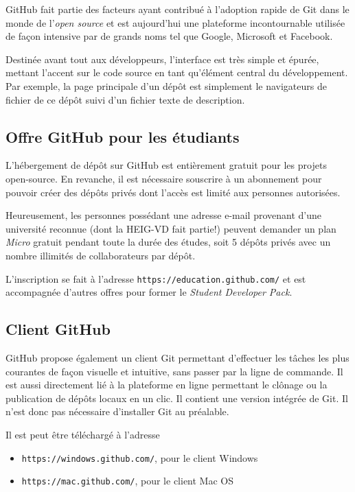 \documentclass[11pt,a4paper]{article}
\begin{document}
GitHub fait partie des facteurs ayant contribué à l'adoption rapide de Git dans le monde de l'\textit{open source} et est aujourd'hui une plateforme incontournable utilisée de façon intensive par de grands noms tel que Google, Microsoft et Facebook. 

Destinée avant tout aux développeurs, l'interface est très simple et épurée, mettant l'accent sur le code source en tant qu'élément central du développement. Par exemple, la page principale d'un dépôt est simplement le navigateurs de fichier de ce dépôt suivi d'un fichier texte de description.

\subsection{Offre GitHub pour les étudiants}

L'hébergement de dépôt sur GitHub est entièrement gratuit pour les projets open-source.
En revanche, il est nécessaire souscrire à un abonnement pour pouvoir créer des dépôts privés dont l'accès est limité aux personnes autorisées.

Heureusement, les personnes possédant une adresse e-mail provenant d'une université reconnue (dont la HEIG-VD fait partie!) peuvent demander un plan \textit{Micro} gratuit pendant toute la durée des études, soit 5 dépôts privés avec un nombre illimités de collaborateurs par dépôt.

L'inscription se fait à l'adresse {\tt https://education.github.com/} et est accompagnée d'autres offres pour former le {\it Student Developer Pack}.

\subsection{Client GitHub}

GitHub propose également un client Git permettant d'effectuer les tâches les plus courantes de façon visuelle et intuitive, sans passer par la ligne de commande.
Il est aussi directement lié à la plateforme en ligne permettant le clônage ou la publication de dépôts locaux en un clic.
Il contient une version intégrée de Git. Il n'est donc pas nécessaire d'installer Git au préalable.

Il est peut être téléchargé à l'adresse

\begin{itemize}
	\item {\tt https://windows.github.com/}, pour le client Windows
	\item {\tt https://mac.github.com/}, pour le client Mac OS
\end{itemize}
\end{document}
